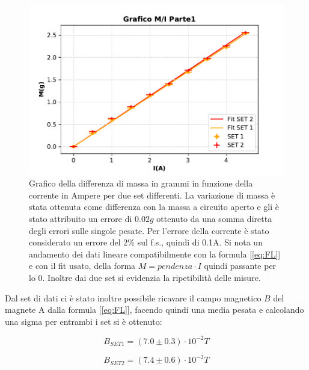 {\fontsize{12}{14}\selectfont 
\begin{figure}[H]
  \centering
  \includegraphics[width=15cm]{Figures/GraficoMIParte1.pdf}
  \caption{Grafico della differenza di massa in grammi in funzione della corrente in Ampere per due set differenti. La variazione di massa è stata ottenuta come differenza con la massa a circuito aperto e gli è stato attribuito un errore di $0.02g$ ottenuto da una somma diretta degli errori sulle singole pesate. Per l'errore della corrente è stato considerato un errore del 2\% sul f.s., quindi di 0.1A. Si nota un andamento dei dati lineare compatibilmente con la formula [\ref{eq:FL}] e con il fit usato, della forma $M = pendenza \cdot I$ quindi passante per lo 0. Inoltre dai due set si evidenzia la ripetibilità delle misure.}   
  \label{fig:GraficoParteI}
\end{figure}

Dal set di dati ci è stato inoltre possibile ricavare il campo magnetico $B$ del magnete A dalla formula [\ref{eq:FL}], facendo quindi una media pesata e calcolando una sigma per entrambi i set si è ottenuto:

\par
\begin{equation*}
    B_{SET1} = (7.0 \pm 0.3)\cdot 10^{-2}T
\end{equation*}

\begin{equation*}
    B_{SET2} = (7.4 \pm 0.6)\cdot 10^{-2}T 
\end{equation*}



}
